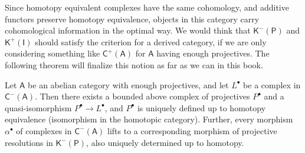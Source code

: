 Since homotopy equivalent complexes have the same cohomology, and additive functors preserve homotopy equivalence, objects in this category carry cohomological information in the optimal way. We would think that $\mathsf{K} ^{-} (\mathsf{P} )$ and $\mathsf{K} ^{+} (\mathsf{I} )$ should satisfy the criterion for a derived category, if we are only considering something like $\mathsf{C} ^{+} (\mathsf{A} )$ for $\mathsf{A} $ having enough projectives. The following theorem will finalize this notion as far as we can in this book.
\begin{theorem}\label{thm:9.6.1}
	Let $\mathsf{A} $ be an abelian category with enough projectives, and let $L^{\bullet} $ be a complex in $\mathsf{C} ^{-} (\mathsf{A} )$. Then there exists a bounded above complex of projectives $P^{\bullet} $ and a quasi-isomorphism $P^{\bullet} \to L^{\bullet} $, and $P^{\bullet} $ is uniquely defined up to homotopy equivalence (isomorphism in the homotopic category). Further, every morphism $\alpha ^{\bullet} $ of complexes in $\mathsf{C} ^{-} (\mathsf{A} )$ lifts to a corresponding morphism of projective resolutions in $\mathsf{K} ^{-} (\mathsf{P} )$, also uniquely determined up to homotopy.
\end{theorem}
